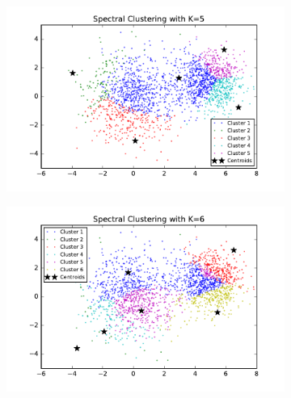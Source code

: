 \begin{figure}[htb]
\begin{subfigure}[b]{0.475\textwidth}
        \end{subfigure}
        \begin{subfigure}[b]{0.475\textwidth}  
            \centering 
            \includegraphics[width=\textwidth]{./figures/clustering_spectral_5.pdf}
        \end{subfigure}
        \hfill
        \begin{subfigure}[b]{0.475\textwidth}   
            \centering 
            \includegraphics[width=\textwidth]{./figures/clustering_spectral_6.pdf}
        \end{subfigure}
        \begin{subfigure}[b]{0.475\textwidth}   
            \centering 

\end{subfigure}
\end{figure}

